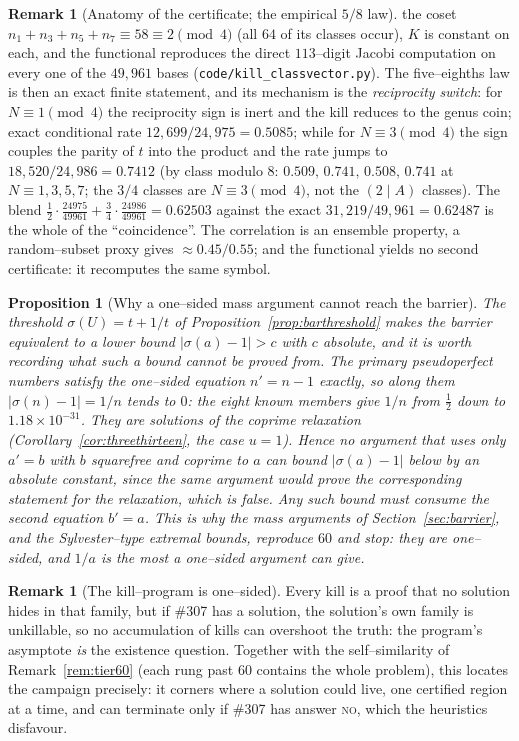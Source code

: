 \documentclass[11pt]{article}
\newtheorem{proposition}[theorem]{Proposition}
\theoremstyle{definition}
\newtheorem{remark}[theorem]{Remark}
\begin{document}
\begin{remark}[Anatomy of the certificate; the empirical $5/8$ law]
the coset $n_1+n_3+n_5+n_7\equiv58\equiv2\pmod4$ (all $64$ of its classes occur), $K$ is constant
on each, and the functional reproduces the direct $113$--digit Jacobi computation on every one of
the $49{,}961$ bases (\texttt{code/kill\_classvector.py}). The five--eighths law is then an exact
finite statement, and its mechanism is the \emph{reciprocity switch}: for $N\equiv1\pmod4$ the
reciprocity sign is inert and the kill reduces to the genus coin; exact conditional rate
$12{,}699/24{,}975=0.5085$; while for $N\equiv3\pmod4$ the sign couples the parity of $t$ into
the product and the rate jumps to $18{,}520/24{,}986=0.7412$ (by class modulo $8$:
$0.509,\,0.741,\,0.508,\,0.741$ at $N\equiv1,3,5,7$; the $3/4$ classes are $N\equiv3\pmod4$, not
the $(2\mid A)$ classes). The blend $\tfrac12\cdot\tfrac{24975}{49961}+\tfrac34\cdot\tfrac{24986}{49961}
=0.62503$ against the exact $31{,}219/49{,}961=0.62487$ is the whole of the ``coincidence''. The
correlation is an ensemble property, a random--subset proxy gives ${\approx}0.45/0.55$; and
the functional yields no second certificate: it recomputes the same symbol.
\end{remark}

\begin{proposition}[Why a one--sided mass argument cannot reach the barrier]\label{prop:twosided}
The threshold $\sigma(U)=t+1/t$ of Proposition~\ref{prop:barthreshold} makes the barrier equivalent to a
lower bound $|\sigma(a)-1|>c$ with $c$ absolute, and it is worth recording what such a bound cannot
be proved from. The primary pseudoperfect numbers satisfy the one--sided equation $n'=n-1$ exactly,
so along them $|\sigma(n)-1|=1/n$ tends to $0$: the eight known members give
$1/n$ from $\tfrac12$ down to $1.18\times10^{-31}$. They are solutions of the coprime relaxation
(Corollary~\ref{cor:threethirteen}, the case $u=1$). Hence no argument that uses only $a'=b$ with $b$
squarefree and coprime to $a$ can bound $|\sigma(a)-1|$ below by an absolute constant, since the same
argument would prove the corresponding statement for the relaxation, which is false. Any such bound must
consume the second equation $b'=a$. This is why the mass arguments of Section~\ref{sec:barrier}, and the
Sylvester--type extremal bounds, reproduce $60$ and stop: they are one--sided, and $1/a$ is the most a
one--sided argument can give.
\end{proposition}

\begin{remark}[The kill--program is one--sided]\label{rem:oneside}
Every kill is a proof that no solution hides in that family, but if \#307 has a solution, the
solution's own family is unkillable, so no accumulation of kills can overshoot the truth: the
program's asymptote \emph{is} the existence question. Together with the self--similarity of
Remark~\ref{rem:tier60} (each rung past $60$ contains the whole problem), this locates the
campaign precisely: it corners where a solution could live, one certified region at a time, and
can terminate only if \#307 has answer \textsc{no}, which the heuristics disfavour.
\end{remark}
\end{document}
